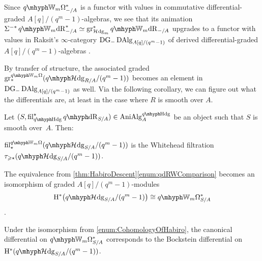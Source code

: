 \documentclass[DIV=12,numbers=enddot,leqno,bibliography=totoc]{scrartcl}
\begin{document}
	\begin{numpar}
		Since $\qIW_m\Omega_{-/A}^*$ is a functor with values in commutative differential-graded $A[q]/(q^m-1)$-algebras, we see that its animation $\Sigma^{-*}\qIW_m\deRham_{-/A}^*\simeq\gr_{\Hhodge_m}^*\qIW_m\deRham_{-/A}$ upgrades to a functor with values in Raksit's $\infty$-category $\mathrm{DG}_-\operatorname{DAlg}_{A[q]/(q^m-1)}$ of derived differential-graded $A[q]/(q^m-1)$-algebras \cite[Definition~]{RaksitFilteredCircle}.
		
		By transfer of structure, the associated graded $\gr_*^{\qIW_m\Omega}(\qHhodge_{R/A}/(q^m-1))$ becomes an element in $\mathrm{DG}_-\operatorname{DAlg}_{A[q]/(q^m-1)}$ as well. Via the following corollary, we can figure out what the differentials are, at least in the case where $R$ is smooth over $A$.
	\end{numpar}
	\begin{cor}\label{cor:CDGA}
		Let $(S, \fil_{\qHodge}^\star\qdeRham_{S/A})\in \cat{AniAlg}_A^{\qHodge}$ be an object such that $S$ is smooth over~$A$. Then:
		\begin{alphanumerate}
			\item  $ \fil_\star^{\qIW_m\Omega}(\qHhodge_{S/A}/(q^m-1))$ is the Whitehead filtration $\tau_{\geqslant \star}(\qHhodge_{S/A}/(q^m-1))$.\label{enum:qWOmegaFiltrationPostnikov}
			\item The equivalence from \cref{thm:HabiroDescent}\cref{enum:qdRWComparison} becomes an isomorphism of graded $A[q]/(q^m-1)$-modules \label{enum:CohomologyOfHabiro}
			\begin{equation*}
				\H^*\bigl(\qHhodge_{S/A}/(q^m-1)\bigr)\cong \qIW_m\Omega_{S/A}^*
			\end{equation*}
			.
			\item\label{enum:BocksteinDifferential} Under the isomorphism from \cref{enum:CohomologyOfHabiro}, the canonical differential on $\qIW_m\Omega_{S/A}^*$ corresponds to the Bockstein differential on $\H^*(\qHhodge_{S/A}/(q^m-1))$.
		\end{alphanumerate}
	\end{cor}
\end{document}
